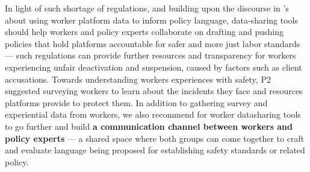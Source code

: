 In light of such shortage of regulations, and building upon the discourse in \citet{policy_probes}'s about using worker platform data to inform policy language, data-sharing tools should help workers and policy experts collaborate on drafting and pushing policies that hold platforms accountable for safer and more just labor standards --- such regulations can provide further resources and transparency for workers experiencing unfair deactivation and suspension, caused by factors such as client accusations. 
Towards understanding workers experiences with safety, P2 suggested surveying workers to learn about the incidents they face and resources platforms provide to protect them. 
In addition to gathering survey and experiential data from workers, we also recommend for worker datasharing tools to go further and build \textbf{a communication channel between workers and policy experts} --- a shared space where both groups can come together to craft and evaluate language being proposed for establishing safety standards or related policy.


